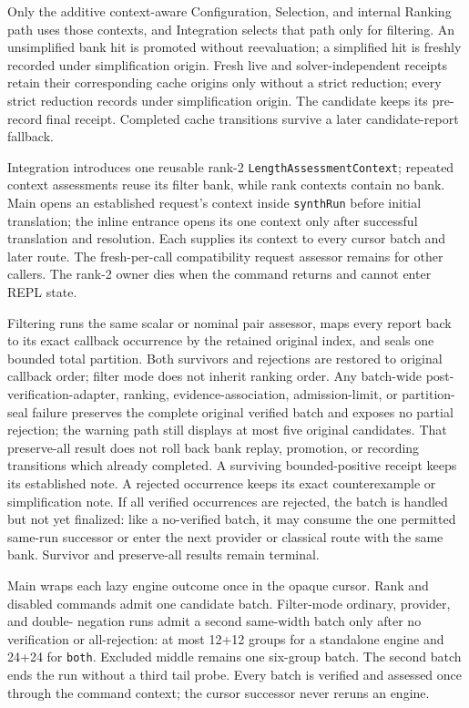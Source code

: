 \documentclass[11pt,oneside]{article}
\newcommand{\code}[1]{\texttt{#1}}
\begin{document}
Only the additive context-aware Configuration, Selection, and internal Ranking
path uses those contexts, and Integration selects that path only for filtering.
An unsimplified bank hit is promoted without reevaluation; a simplified hit is
freshly recorded under simplification origin. Fresh live and solver-independent
receipts retain their corresponding cache origins only without a strict
reduction; every strict reduction records under simplification origin. The
candidate keeps its pre-record final receipt. Completed cache transitions survive a later
candidate-report fallback.

Integration introduces one reusable rank-2
\code{LengthAssessmentContext}; repeated context assessments reuse its filter
bank, while rank contexts contain no bank. Main opens an established request's
context inside \code{synthRun} before initial translation; the inline entrance
opens its one context only after successful translation and resolution. Each
supplies its context to every cursor batch and later route. The
fresh-per-call compatibility request assessor remains for other callers. The
rank-2 owner dies when the command returns and cannot enter REPL state.

Filtering runs the same scalar or nominal pair assessor, maps every report
back to its exact callback occurrence by the retained original index, and
seals one bounded total partition. Both survivors and rejections are restored
to original callback order; filter mode does not inherit ranking order. Any
batch-wide post-verification-adapter, ranking, evidence-association,
admission-limit, or partition-seal failure preserves the complete original
verified batch and exposes no partial rejection; the warning path still
displays at most five original candidates. That preserve-all result does not
roll back bank replay, promotion, or recording transitions which already
completed. A
surviving bounded-positive receipt keeps its established note. A rejected
occurrence keeps its exact counterexample or simplification note. If all
verified occurrences are rejected, the batch is handled but not yet finalized:
like a no-verified batch, it may consume the one permitted same-run successor
or enter the next provider or classical route with the same bank. Survivor and
preserve-all results remain terminal.

Main wraps each lazy engine outcome once in the opaque cursor. Rank and disabled
commands admit one candidate batch. Filter-mode ordinary, provider, and double-
negation runs admit a second same-width batch only after no verification or
all-rejection: at most 12+12 groups for a standalone engine and 24+24 for
\code{both}. Excluded middle remains one six-group batch. The second batch ends
the run without a third tail probe. Every batch is verified and assessed once
through the command context; the cursor successor never reruns an engine.
\end{document}
